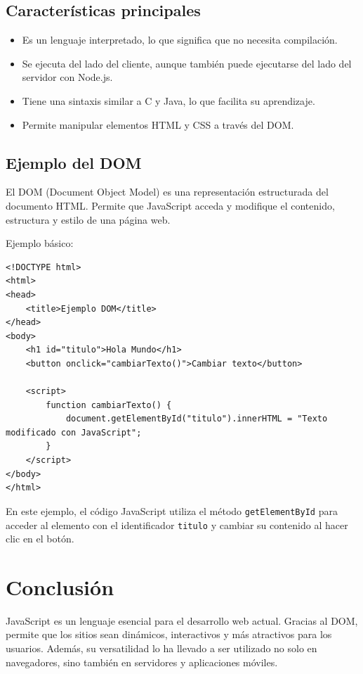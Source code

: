 \documentclass[11pt]{scrartcl}
\begin{document}
\subsection{Características principales}
\begin{itemize}
    \item Es un lenguaje interpretado, lo que significa que no necesita compilación.
    \item Se ejecuta del lado del cliente, aunque también puede ejecutarse del lado del servidor con Node.js.
    \item Tiene una sintaxis similar a C y Java, lo que facilita su aprendizaje.
    \item Permite manipular elementos HTML y CSS a través del DOM.
\end{itemize}

\subsection{Ejemplo del DOM}
El DOM (Document Object Model) es una representación estructurada del documento HTML. Permite que JavaScript acceda y modifique el contenido, estructura y estilo de una página web.

\noindent
Ejemplo básico:
\begin{verbatim}
<!DOCTYPE html>
<html>
<head>
    <title>Ejemplo DOM</title>
</head>
<body>
    <h1 id="titulo">Hola Mundo</h1>
    <button onclick="cambiarTexto()">Cambiar texto</button>

    <script>
        function cambiarTexto() {
            document.getElementById("titulo").innerHTML = "Texto modificado con JavaScript";
        }
    </script>
</body>
</html>
\end{verbatim}

En este ejemplo, el código JavaScript utiliza el método \texttt{getElementById} para acceder al elemento con el identificador \texttt{titulo} y cambiar su contenido al hacer clic en el botón.  

\section{Conclusión}
JavaScript es un lenguaje esencial para el desarrollo web actual. Gracias al DOM, permite que los sitios sean dinámicos, interactivos y más atractivos para los usuarios. Además, su versatilidad lo ha llevado a ser utilizado no solo en navegadores, sino también en servidores y aplicaciones móviles.  
\end{document}
